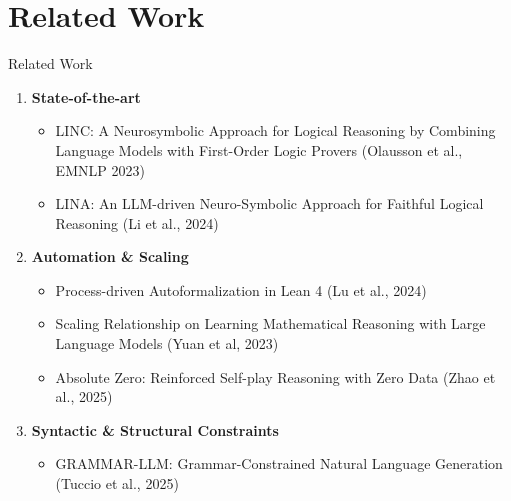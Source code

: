 \documentclass[10pt, aspectratio=169]{beamer}
\begin{document}
\section{Related Work}
\begin{frame}{Related Work}
  \begin{enumerate}
    \item \textbf{State-of-the-art}
    \begin{itemize}
      \item LINC: A Neurosymbolic Approach for Logical Reasoning by Combining Language Models with First-Order Logic Provers (Olausson et al., EMNLP 2023)
      \item LINA: An LLM-driven Neuro-Symbolic Approach for Faithful Logical Reasoning (Li et al., 2024)
    \end{itemize}
    \pause
    \item \textbf{Automation \& Scaling}
    \begin{itemize}
      \item Process-driven Autoformalization in Lean 4 (Lu et al., 2024)
      \item Scaling Relationship on Learning Mathematical Reasoning with Large Language Models (Yuan et al, 2023)
      \item Absolute Zero: Reinforced Self-play Reasoning with Zero Data (Zhao et al., 2025)
    \end{itemize}
    \pause
    \item \textbf{Syntactic \& Structural Constraints}
    \begin{itemize}
      \item GRAMMAR-LLM: Grammar-Constrained Natural Language Generation (Tuccio et al., 2025)
    \end{itemize}
  \end{enumerate}
\end{frame}


\end{document}
